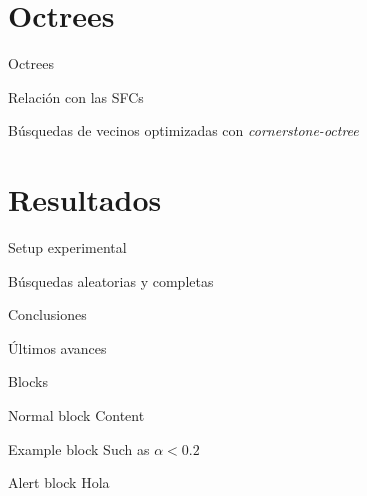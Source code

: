 \documentclass[aspectratio=169]{beamer}
\begin{document}
\section{Octrees}
\begin{frame}{Octrees}
    
\end{frame}

\begin{frame}{Relación con las SFCs}
    
\end{frame}

\begin{frame}{Búsquedas de vecinos optimizadas con \textit{cornerstone-octree}}
    
\end{frame}

\section{Resultados}
\begin{frame}{Setup experimental}
    
\end{frame}

\begin{frame}{Búsquedas aleatorias y completas}
    
\end{frame}

\begin{frame}{Conclusiones}
    
\end{frame}

\begin{frame}{Últimos avances}
    
\end{frame}


\begin{frame}{Blocks}
    \begin{block}{Normal block}
        Content
    \end{block}
    \begin{exampleblock}{Example block}
        Such as $\alpha < 0.2$
    \end{exampleblock}
    \begin{alertblock}{Alert block}
        Hola
    \end{alertblock}
\end{frame}
\end{document}
